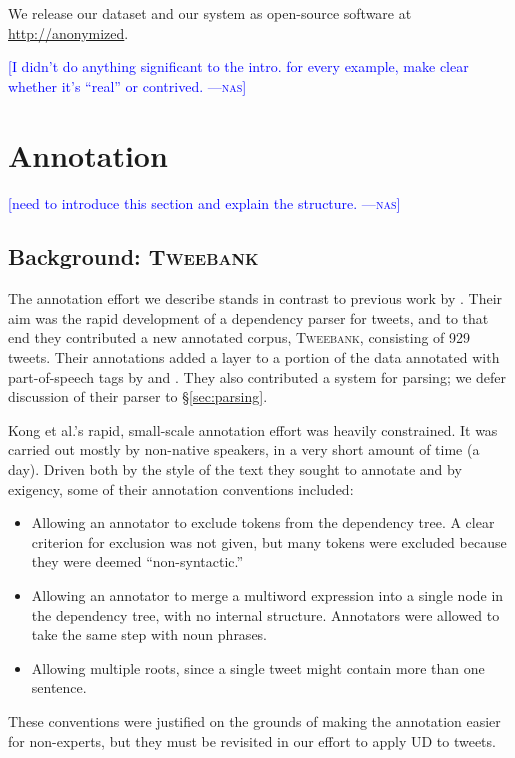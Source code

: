\documentclass[11pt,a4paper]{article}
\newcommand{\nascomment}[1]{\textcolor{blue}{[#1 ---\textsc{nas}]}}
\begin{document}
We release our dataset and our system as open-source software at
\url{http://anonymized}. 

\nascomment{I didn't do anything significant to the intro.  for every
  example, make clear whether it's ``real'' or contrived.}

\section{Annotation}\label{sec:anno}

\nascomment{need to introduce this section and explain the structure.}

\subsection{Background: \textsc{Tweebank}}

The annotation effort we describe stands in contrast to previous work
by .  Their aim was the rapid
development of a dependency parser for tweets, and to that end they
contributed a new annotated corpus, \textsc{Tweebank}, consisting of
929 tweets.  Their annotations added a layer to a portion of the data
annotated with part-of-speech tags by
 and
.  They also contributed a system
for parsing;
we defer discussion of their parser to \S\ref{sec:parsing}.

Kong et al.'s rapid, small-scale annotation effort was heavily constrained.  It was
carried out mostly by non-native speakers, in a very short amount of
time (a day).  Driven both by the style of the text they sought to annotate
and by exigency, some of their annotation conventions included:
\begin{itemize}
\item Allowing an annotator to exclude tokens from the dependency
  tree.  A clear criterion for exclusion was not given, but many
  tokens were excluded because they were deemed ``non-syntactic.''
\item Allowing an annotator to merge a multiword expression into a
  single node in the dependency tree, with no internal structure.
  Annotators were allowed to take the same step with noun phrases.
\item Allowing multiple roots, since a single tweet might contain more
  than one sentence.
\end{itemize}
These conventions were justified on the grounds of making the
annotation easier for non-experts, but they must be revisited in our
effort to apply UD to tweets.
\end{document}
